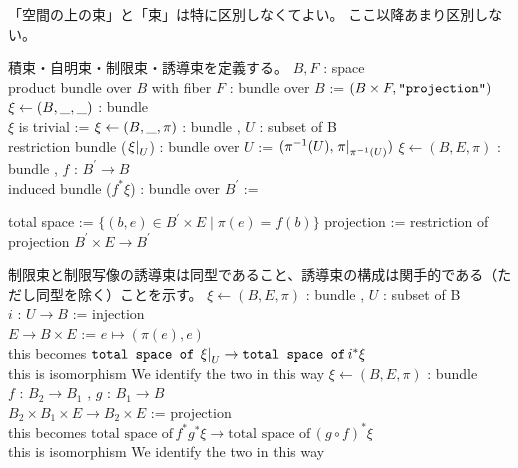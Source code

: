 \begin{Definition}
\itemnote
  「空間の上の束」と「束」は特に区別しなくてよい。
  ここ以降あまり区別しない。
\end{Definition}

\begin{Definition}
\itemnote
  積束・自明束・制限束・誘導束を定義する。
\itemdefi
  \For \(B , F\) : space \\
  \Define product bundle over \(B\) with fiber \(F\) : bundle over \(B\) := \((B \times F , \texttt{"projection"})\)
\itemdefi
  \For \(\xi \leftarrow (B , \_ , \_)\) : bundle \\
  \Define \(\xi\) is trivial := 
\itemdefi
  \For \(\xi \leftarrow (B , \_ , \pi)\) : bundle , \(U\) : subset of B \\
  \Define restriction bundle (\(\left. {\xi} \right| _{U}\)) : bundle over \(U\) := \((\pi^{-1}(U) , \left. {\pi} \right| _{\pi^{-1}(U)})\)
\itemdefi
  \For \(\xi \leftarrow (B , E , \pi)\) : bundle , \(f\) : \(B^{\prime} \to B\) \\
  \Define induced bundle (\(f^*\xi\)) : bundle over \(B^{\prime}\) :=
  \begin{itemize}
    \itemenum total space := \(\{(b , e) \in B^{\prime} \times E \mid \pi(e) = f(b)\}\)
    \itemenum projection := restriction of projection \(B^{\prime} \times E \to B^{\prime}\)
  \end{itemize}
\end{Definition}

\begin{Theorem}
\itemnote
  制限束と制限写像の誘導束は同型であること、誘導束の構成は関手的である（ただし同型を除く）ことを示す。
\itemprop
  \For \(\xi \leftarrow (B , E ,\pi)\) : bundle , \(U\) : subset of B \\
  \Let \(i\) : \(U \to B\) := injection \\
  \Let \(E \to B \times E\) := \(e \mapsto (\pi(e) , e)\) \\
  \Then this becomes \(\texttt{total space of} \, \left. {\xi} \right| _{U} \to \texttt{total space of} \, i^*\xi\) \\
  \Then this is isomorphism
\itemnote
  We identify the two in this way
\itemprop
  \For \(\xi \leftarrow (B , E , \pi)\) : bundle \\
  \For \(f\) : \(B_2 \to B_1\) , \(g\) : \(B_1 \to B\) \\
  \Let \(B_2 \times B_1 \times E \to B_2 \times E\) := projection \\
  \Then this becomes \(\text{total space of} \, f^*g^* \xi \to \text{total space of} \, (g \circ f)^* \xi\) \\
  \Then this is isomorphism
\itemnote
  We identify the two in this way 
\end{Theorem}


